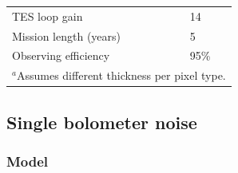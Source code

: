 \documentclass[]{spie}  %
\newcommand{\comr}[1]{\textcolor{red}{#1}}
\begin{document}
\begin{table}[ht]
\begin{tabular}{|l|l|}
TES loop gain                    & 14                                \\
Mission length (years)           & 5                                                \\
Observing efficiency             & 95\%                                             \\
\hline
\multicolumn{2}{l}{\footnotesize $^a$Assumes different thickness per pixel type.}
\end{tabular}
\end{table}


\subsection{Single bolometer noise}
\label{sec:det_noise}

\subsubsection{Model}
\label{sec:model}
\end{document}

